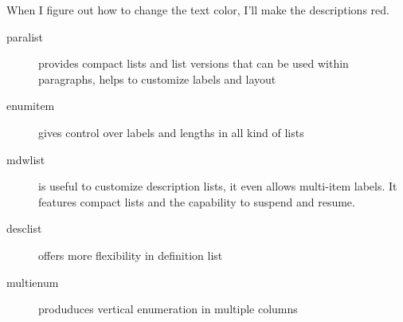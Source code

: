 \documentclass{article}
\begin{document}
When I figure out how to change the text color, I'll make the descriptions red.

\begin{description}
  \item[paralist] provides compact lists and list versions that can be used within paragraphs, helps to customize labels and layout
  \item [enumitem] gives control over labels and lengths in all kind of lists
  \item [mdwlist]  is useful to customize description lists, it even allows multi-item labels. It features compact lists and the capability to suspend and resume.
  \item [desclist] offers more flexibility in definition list
  \item [multienum] produduces vertical enumeration in multiple columns
\end{description}
\end{document}
